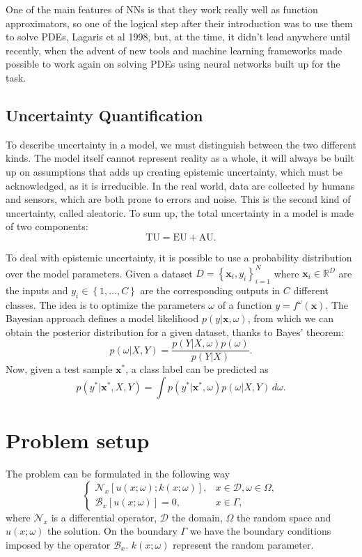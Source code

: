 \documentclass[11pt,a4paper]{article}
\begin{document}
One of the main features of NNs is that they work really well as function approximators, so one of the logical step after their introduction was to use them to solve PDEs, Lagaris et al 1998, but, at the time, it didn't lead anywhere until recently, when the advent of new tools and machine learning frameworks made possible to work again on solving PDEs using neural networks built up for the task.
\subsection{Uncertainty Quantification}
To describe uncertainty in a model, we must distinguish between the two different kinds. The model itself cannot represent reality as a whole, it will always be built up on assumptions that adds up creating epistemic uncertainty, which must be acknowledged, as it is irreducible. In the real world, data are collected by humans and sensors, which are both prone to errors and noise. This is the second kind of uncertainty, called aleatoric. To sum up, the total uncertainty in a model is made of two components:
\[
    \text{TU} = \text{EU} + \text{AU}.
\]

To deal with epistemic uncertainty, it is possible to use a probability distribution over the model parameters. Given a dataset \(D = \left\{ \bm{x}_i, y_i \right\}^N_{i=1}\) where \(\bm{x}_i \in \mathbb{R}^D\) are the inputs and \(y_i \in \left\{ 1,\ldots, C \right\}\) are the corresponding outputs in \(C\) different classes. The idea is to optimize the parameters \(\omega\) of a function \(y = f^\omega(\bm{x})\). The Bayesian approach defines a model likelihood \(p(y\vert\bm{x}, \omega)\), from which we can obtain the posterior distribution for a given dataset, thanks to Bayes' theorem:
\[
    p(\omega \vert X, Y) = \frac{p(Y\vert X, \omega)p(\omega)}{p(Y\vert X)}.
\]
Now, given a test sample \(\bm{x}^*\), a class label can be predicted as 
\[
    p(y^*\vert \bm{x}^*, X, Y) = \int p(y^*\vert\bm{x}^*, \omega) p(\omega \vert X, Y) \, d\omega.
\]

\section{Problem setup}
The problem can be formulated in the following way
\begin{equation}
    \begin{cases}
        \mathcal{N}_x\left[ u(x;\omega); k(x;\omega) \right], & x \in \mathcal{D}, \omega \in \Omega, \\
        \mathcal{B}_x\left[ u(x;\omega) \right] = 0, & x \in \Gamma,
    \end{cases}
    \label{problem_setup}
\end{equation}
where \(\mathcal{N}_x\) is a differential operator, \(\mathcal{D}\) the domain, \(\Omega\) the random space and \(u(x;\omega)\) the solution. On the boundary \(\Gamma\) we have the boundary conditions imposed by the operator \(\mathcal{B}_x\). \(k(x;\omega)\) represent the random parameter.
\end{document}
